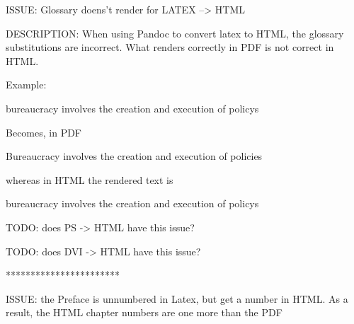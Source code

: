ISSUE: Glossary doens't render for LATEX --> HTML

DESCRIPTION: When using Pandoc to convert latex to HTML, the glossary substitutions are incorrect. 
What renders correctly in PDF is not correct in HTML. 

Example:

\Gls{bureaucracy} involves the creation and execution of \glspl{policy}

Becomes, in PDF

Bureaucracy involves the creation and execution of policies

whereas in HTML the rendered text is

bureaucracy involves the creation and execution of policys


TODO: does PS -> HTML have this issue?

TODO: does DVI -> HTML have this issue?

***********************

ISSUE: the Preface is unnumbered in Latex, but get a number in HTML. As a result, the HTML chapter numbers are one more than the PDF